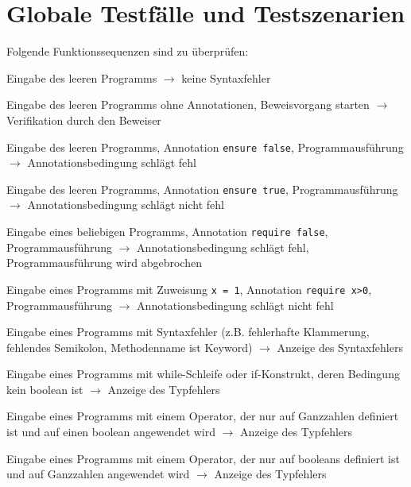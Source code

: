 \documentclass[a4paper,10pt]{article}
\begin{document}
\section{Globale Testf\"{a}lle und Testszenarien}
Folgende Funktionssequenzen sind zu \"{u}berpr\"{u}fen:\\
\begin{T}{}{}Eingabe des leeren Programms $\to$ keine Syntaxfehler
\end{T}\begin{T}{}{}Eingabe des leeren Programms ohne Annotationen, Beweisvorgang starten $\to$ Verifikation durch den Beweiser
\end{T}\begin{T}{}{}Eingabe des leeren Programms, Annotation \texttt{ensure false}, Programmausf\"{u}hrung $\to$ Annotationsbedingung schl\"{a}gt fehl
\end{T}\begin{T}{}{}Eingabe des leeren Programms, Annotation \texttt{ensure true}, Programmausf\"{u}hrung $\to$ Annotationsbedingung schl\"{a}gt nicht fehl
\end{T}\begin{T}{}{}Eingabe eines beliebigen Programms, Annotation \texttt{require false}, Programmausf\"{u}hrung $\to$ Annotationsbedingung schl\"{a}gt fehl, Programmausf\"{u}hrung wird abgebrochen
\end{T}\begin{T}{}{}Eingabe eines Programms mit Zuweisung \texttt{x = 1}, Annotation \texttt{require x>0}, Programmausf\"{u}hrung $\to$ Annotationsbedingung schl\"{a}gt nicht fehl
\end{T}\begin{T}{}{}Eingabe eines Programms mit Syntaxfehler (z.B. fehlerhafte Klammerung, fehlendes Semikolon, Methodenname ist Keyword) $\to$ Anzeige des Syntaxfehlers
\end{T}\begin{T}{}{}Eingabe eines Programms mit while-Schleife oder if-Konstrukt, deren Bedingung kein boolean ist $\to$ Anzeige des Typfehlers
\end{T}\begin{T}{}{}Eingabe eines Programms mit einem Operator, der nur auf Ganzzahlen definiert ist und auf einen boolean angewendet wird $\to$ Anzeige des Typfehlers
\end{T}\begin{T}{}{}Eingabe eines Programms mit einem Operator, der nur auf booleans definiert ist und auf Ganzzahlen angewendet wird $\to$ Anzeige des Typfehlers

\end{T}
\end{document}

